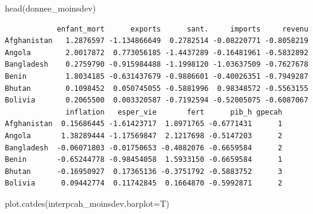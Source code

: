 \documentclass[
]{article}
\newenvironment{Shaded}{}{}
\newcommand{\AttributeTok}[1]{#1}
\newcommand{\FunctionTok}[1]{#1}
\newcommand{\NormalTok}[1]{#1}
\begin{document}
\begin{Shaded}
\begin{Highlighting}[]
\FunctionTok{head}\NormalTok{(donnee\_moinsdev)}
\end{Highlighting}
\end{Shaded}

\begin{verbatim}
            enfant_mort      exports      sant.     imports     revenu
Afghanistan   1.2876597 -1.134866649  0.2782514 -0.08220771 -0.8058219
Angola        2.0017872  0.773056185 -1.4437289 -0.16481961 -0.5832892
Bangladesh    0.2759790 -0.915984488 -1.1998120 -1.03637509 -0.7627678
Benin         1.8034185 -0.631437679 -0.9886601 -0.40026351 -0.7949287
Bhutan        0.1098452  0.050745055 -0.5881996  0.98348572 -0.5563155
Bolivia       0.2065500  0.003320587 -0.7192594 -0.52005075 -0.6087067
              inflation   esper_vie       fert      pib_h gpecah
Afghanistan  0.15686445 -1.61423717  1.8971765 -0.6771431      1
Angola       1.38289444 -1.17569847  2.1217698 -0.5147203      2
Bangladesh  -0.06071803 -0.01750653 -0.4082076 -0.6659584      2
Benin       -0.65244778 -0.98454058  1.5933150 -0.6659584      1
Bhutan      -0.16950927  0.17365136 -0.3751792 -0.5883752      3
Bolivia      0.09442774  0.11742845  0.1664870 -0.5992871      2
\end{verbatim}

\begin{Shaded}
\begin{Highlighting}[]
\FunctionTok{plot.catdes}\NormalTok{(interpcah\_moinsdev,}\AttributeTok{barplot=}\NormalTok{T)}
\end{Highlighting}
\end{Shaded}
\end{document}

